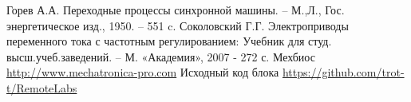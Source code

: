 

\begin{frame}
\frametitle{}
	\small{
\begin{thebibliography}{7}
	Горев А.А. Переходные процессы синхронной машины. -- М.,Л., Гос. энергетическое изд., 1950. -- 551 c.
        Соколовский Г.Г. Электроприводы переменного тока с частотным регулированием: Учебник для студ. высш.учеб.заведений.
                -- М. «Академия», 2007 - 272 с.
	Мехбиос \url{http://www.mechatronica-pro.com}
	 Исходный код блока \url{https://github.com/trot-t/RemoteLabs}
%

\end{thebibliography}
}
\end{frame}


